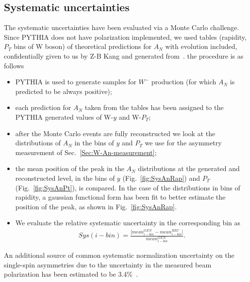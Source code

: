 \documentclass[12pt]{article}
\begin{document}
\subsection{Systematic uncertainties} \label{Sec:Syst}
The systematic uncertainties have been evaluated via a Monte Carlo challenge. %
Since PYTHIA does not have polarization implemented, we used tables (rapidity,$P_{T}$ bins of W boson) of theoretical predictions for $A_{N}$ with evolution included, confidentially given to us by Z-B Kang and generated from~\cite{Kang:2014}. the procedure is as follows

\begin{itemize}
\item PYTHIA is used to generate samples for $W^{-}$ production (for which $A_{N}$ is predicted to be always positive);
\item each prediction for $A_{N}$ taken from the tables has been assigned to the PYTHIA generated values of W-$y$ and W-$P_{T}$;
\item after the Monte Carlo events are fully reconstructed we look at the distributions of $A_{N}$ in the bins of $y$ and $P_{T}$ we use for the asymmetry measurement of Sec.~\ref{Sec:W-An-measurement};
\item the mean position of the peak in the $A_{N}$ distributions at the generated and reconstructed level, in the bins of $y$ (Fig.~\ref{fig:SysAnRap}) and $P_{T}$ (Fig.~\ref{fig:SysAnPt}), is compared. In the case of the distributions in bins of rapidity, a gaussian functional form has been fit to better estimate the position of the peak, as shown in Fig.~\ref{fig:SysAnRap}.  
\item We evaluate the relative systematic uncertainty in the corresponding bin as
\begin{align}
Sys(i-bin)=\frac{|mean^{GEN}_{i-bin}-mean^{REC}_{i-bin}|}{mean^{GEN}_{i-bin}}.
\end{align}
\end{itemize}

An additional source of common systematic normalization uncertainty on the single-spin
asymmetries due to the uncertainty in the measured beam polarization has been estimated to be 3.4\%~\cite{RHIC-Pol}.
\end{document}
